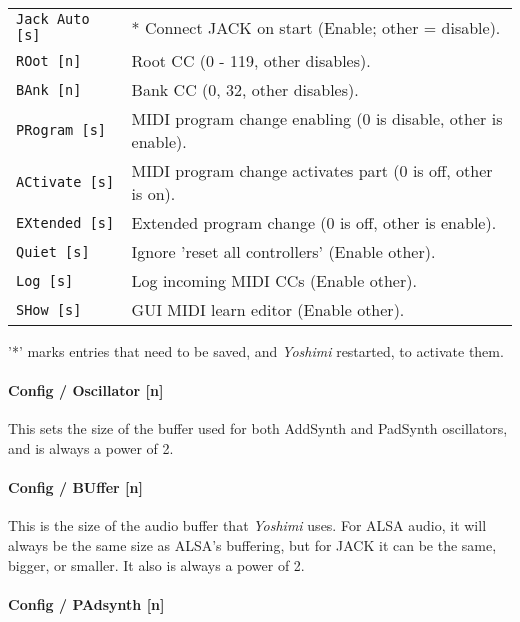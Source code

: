 \begin{table}[H]
\begin{tabular}{l l}
\texttt{Jack Auto [s]} &
   * Connect JACK on start (Enable; other = disable). \\
\texttt{ROot [n]} &
   Root CC (0 - 119, other disables). \\
\texttt{BAnk [n]} &
   Bank CC (0, 32, other disables). \\
\texttt{PRogram [s]} &
   MIDI program change enabling (0 is disable, other is enable). \\
\texttt{ACtivate [s]} &
   MIDI program change activates part (0 is off, other is on). \\
\texttt{EXtended [s]} &
   Extended program change (0 is off, other is enable). \\
\texttt{Quiet [s]} &
   Ignore 'reset all controllers' (Enable other). \\
\texttt{Log [s]} &
   Log incoming MIDI CCs (Enable other). \\
\texttt{SHow [s]} &
   GUI MIDI learn editor (Enable other). \\

      \end{tabular}
   \end{table}

   '*' marks entries that need to be saved, and \textsl{Yoshimi}
   restarted, to activate them.

\paragraph{Config / Oscillator [n]}
\label{paragraph:command_line_config_oscillator}

   This sets the size of the buffer used for both AddSynth and PadSynth
   oscillators, and is always a power of 2.

\paragraph{Config / BUffer [n]}
\label{paragraph:command_line_config_buffer}

   This is the size of the audio buffer that \textsl{Yoshimi} uses.  For ALSA
   audio, it will always be the same size as ALSA's buffering, but for JACK it
   can be the same, bigger, or smaller. It also is always a power of 2.

\paragraph{Config / PAdsynth [n]}
\label{paragraph:command_line_config_padsynth}


